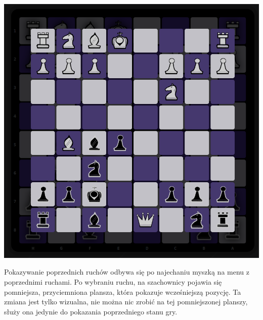 \documentclass[12pt,a4paper]{article}
\begin{document}
\begin{minipage}[t]{0.45\textwidth} 
    \vspace{0pt} 
    \centering 
    \includegraphics[width=\linewidth]{zdj/ins_min_prev.png} 
\end{minipage} 
\hfill 
\begin{minipage}[t]{0.45\textwidth} 
    \vspace{40pt}
    \centering 
    Pokazywanie poprzednich ruchów odbywa się po najechaniu myszką na menu z poprzednimi ruchami. Po wybraniu ruchu, na szachownicy pojawia się pomniejsza, przyciemniona plansza, która pokazuje wcześniejszą pozycję. Ta zmiana jest tylko wizualna, nie można nic zrobić na tej pomniejszonej planszy, służy ona jedynie do pokazania poprzedniego stanu gry.
\end{minipage}


\vspace{1cm}
\end{document}
